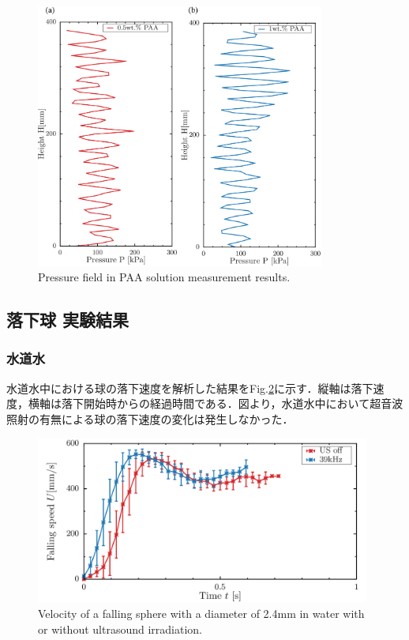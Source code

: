 \begin{figure}[ht]
    \centering
    \includegraphics[width=9.5cm,clip]{4-Results/press.png}
    \caption{Pressure field in PAA solution measurement results.}
    \label{fig:pressure}
\end{figure}

\newpage

\subsection{落下球 実験結果}

\subsubsection{水道水}

水道水中における球の落下速度を解析した結果をFig.\ref{fig:water}に示す．縦軸は落下速度，横軸は落下開始時からの経過時間である．図より，水道水中において超音波照射の有無による球の落下速度の変化は発生しなかった．

\begin{figure}[ht]
    \centering
    \includegraphics[width=11cm,clip]{./4-Results/f-water.png}
    \caption{Velocity of a falling sphere with a diameter of 2.4mm in water with or without ultrasound irradiation.}
    \label{fig:water}
\end{figure}

